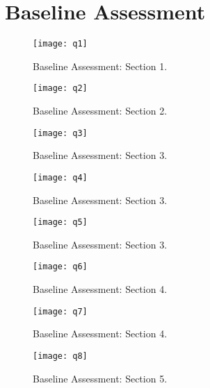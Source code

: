 
\chapter{Baseline Assessment}
\begin{figure}[h]
\centering
\texttt{[image: q1]}
\caption{Baseline Assessment: Section 1.}
\end{figure}

\begin{figure}[h]
\centering
\texttt{[image: q2]}
\caption{Baseline Assessment: Section 2.}
\end{figure}

\begin{figure}[h]
\centering
\texttt{[image: q3]}
\caption{Baseline Assessment: Section 3.}
\end{figure}

\begin{figure}[h]
\centering
\texttt{[image: q4]}
\caption{Baseline Assessment: Section 3.}
\end{figure}

\begin{figure}[h]
\centering
\texttt{[image: q5]}
\caption{Baseline Assessment: Section 3.}
\end{figure}

\begin{figure}[h]
\centering
\texttt{[image: q6]}
\caption{Baseline Assessment: Section 4.}
\end{figure}

\begin{figure}[h]
\centering
\texttt{[image: q7]}
\caption{Baseline Assessment: Section 4.}
\end{figure}

\begin{figure}[h]
\centering
\texttt{[image: q8]}
\caption{Baseline Assessment: Section 5.}
\end{figure}